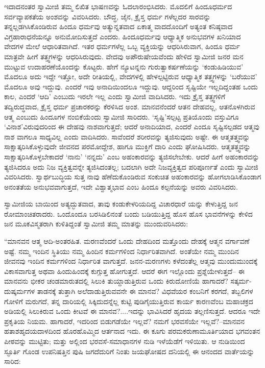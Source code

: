 ಇದಾದನಂತರ ಸ್ವಾಮೀಜಿ ತಮ್ಮ ಲಿಖಿತ ಭಾಷಣವನ್ನು ಓದಲಾರಂಭಿಸಿದರು. ಮೊದಲಿಗೆ ಹಿಂದೂಧರ್ಮದ ಸರ್ವವ್ಯಾಪಕತೆಯ ಅಂಶವನ್ನು ವಿವರಿಸಿದರು. ಬೌದ್ಧ, ಜೈನ, ಕ್ರೈಸ್ತ ಧರ್ಮ ಗಳೆಲ್ಲದರ ಸಾರವನ್ನು ತನ್ನಲ್ಲಡಗಿಸಿಕೊಂಡಿರುವ ಹಿಂದೂ ಧರ್ಮವು ಅತ್ಯುನ್ನತವಾದ ಏಕಾತ್ಮ ವಾದದೊಂದಿಗೆ ಅತ್ಯಂತ ಕನಿಷ್ಠವಾದ ವಿಗ್ರಹಾರಾಧನೆಯನ್ನೂ ಅನುಮೋದಿಸುತ್ತದೆ ಎಂದರು. ಹಿಂದೂಧರ್ಮವು ಆಧ್ಯಾತ್ಮಿಕ ಅನುಭವಗಳ ಖನಿಯಾದ ವೇದಗಳ ಮೇಲೆ ಆಧಾರಿತವಾಗಿದೆ. ಇತರ ಧರ್ಮಗಳೆಲ್ಲ ಒಬ್ಬ ವ್ಯಕ್ತಿಯನ್ನು ಆಧರಿಸಿರುವಾಗ, ಹಿಂದೂ ಧರ್ಮ ಮಾತ್ರವೇ ಹೀಗೆ ತತ್ತ್ವಗಳನ್ನು ಆಧರಿಸಿರುವುದು. ವೇದವು ಅಪೌರುಷೇಯವೆಂದು ಹೇಳಿದ ಸ್ವಾಮೀಜಿ ಜನರ ಮನ ಮುಟ್ಟುವ ಉದಾಹರಣೆಯೊಂದನ್ನು ಕೊಟ್ಟರು. ಹೇಗೆ ನ್ಯೂಟನ್ನನು ಗುರುತ್ವಾಕರ್ಷಣೆಯನ್ನು ‘ಕಂಡುಹಿಡಿಯುವ’ ಮೊದಲೂ ಅದು ಇದ್ದೇ ಇತ್ತೋ, ಅದೇ ರೀತಿಯಲ್ಲಿ, ವೇದಗಳಲ್ಲಿ ಹೇಳಲ್ಪಟ್ಟಿರುವ ಆಧ್ಯಾತ್ಮಿಕ ತತ್ತ್ವಗಳನ್ನು ‘ಬರೆಯುವ’ ಮೊದಲೂ ಅವು ಇದ್ದುವು. ಎಂದರೆ ಇವು ಅನಾದಿಯಿಂದಲೂ ಇದ್ದುವು. ಆದ್ದರಿಂದ ಸೃಷ್ಟಿಯೇ ಇಲ್ಲದಿದ್ದಂತಹ ಒಂದು ಕಾಲ, ಎಂದರೆ ‘ಆದಿ’ ಎಂಬುದು ಇರಲೇ ಇಲ್ಲ ಎಂದು ಸ್ವಾಮೀಜಿ ವಾದಿಸಿದರು. ಇದು ಕ್ರೈಸ್ತ ತತ್ತ್ವಗಳಿಗೆ ತದ್ವಿರುದ್ಧವಾದ, ಕ್ರೈಸ್ತ ಧರ್ಮ ಪ್ರಚಾರಕರನ್ನು ಕೆರಳಿಸಿದ ಅಂಶ. ಮಾನವನೆಂದರೆ ಆತನ ದೇಹವಲ್ಲ, ಆತನೊಳಗಿರುವ ಆತ್ಮ ಎಂಬುದು ಹಿಂದೂಗಳ ನಂಬಿಕೆಯೆಂದು ಸ್ವಾಮೀಜಿ ಸಾರಿದರು. ‘ಸೃಷ್ಟಿ’ಸಲ್ಪಟ್ಟ ಪ್ರತಿಯೊಂದು ವಸ್ತುವಿಗೂ ‘ವಿನಾಶ’ವಿರುವುದರಿಂದ ಈ ದೇಹವು ನಾಶವಾಗುತ್ತದೆ; ಆದರೆ ಅನಾದಿಯಾದ, ಎಂದರೆ ಎಂದೂ ಸೃಷ್ಟಿಸಲ್ಪಡದ ಆತ್ಮವು ನಾಶ ವಾಗಲೂ ಸಾಧ್ಯವಿಲ್ಲ ಎಂದು ವಾದಿಸಿದರು. ಸಾವೆಂದರೆ ಶರೀರವನ್ನು ತ್ಯಜಿಸುವುದು ಅಷ್ಟೇ. ಈ ಆತ್ಮತತ್ತ್ವವನ್ನು ಸಾಕ್ಷಾತ್ಕರಿಸಿಕೊಳ್ಳುವುದೇ ಜೀವನದ ಪರಮೋದ್ದೇಶ, ಹಾಗೂ ಮುಕ್ತಿಗೆ ದಾರಿ ಎಂದು ಘೋಷಿಸಿದರು. ಆತ್ಮತತ್ತ್ವವನ್ನು ಸಾಕ್ಷಾತ್ಕರಿಸಿಕೊಳ್ಳಬೇಕಾದರೆ ‘ನಾನು’ ‘ನನ್ನದು’ ಎಂಬ ಅಹಂಕಾರವನ್ನು ತ್ಯಜಿಸಲೇಬೇಕು. ಆದರೆ ಹೀಗೆ ಅಹಂಕಾರವನ್ನು ತ್ಯಜಿಸಿದರೂ ಅದು ನಿಜ ವ್ಯಕ್ತಿತ್ವವನ್ನೇ ತ್ಯಜಿಸಿದಂತಲ್ಲ; ಬದಲಾಗಿ ಅದೇ ನಿಜವ್ಯಕ್ತಿತ್ವದ ಪರಿಪೂರ್ಣತೆ ಎಂದು ಸ್ವಾಮೀಜಿ ವಿವರಿಸಿದರು. ಸ್ವಾರ್ಥಬುದ್ಧಿಯ ಸುತ್ತ ನಾವು ಹೆಣೆದುಕೊಂಡಿರುವ ಸಂಕುಚಿತ ಅಹಂಕಾರವನ್ನು ಹೋಗಲಾಡಿಸಿಕೊಂಡಾಗ ಅನಂತತೆಯ ಅನುಭವವಾಗುತ್ತದೆ, ಇದೇ ವಿಶ್ವಾತ್ಮಭಾವ ಎಂಬ ಹಿಂದೂ ಕಲ್ಪನೆಯನ್ನು ಅವರು ವಿವರಿಸಿದರು.

ಸ್ವಾಮೀಜಿಯ ಬಾಯಿಂದ ಅತ್ಯದ್ಭುತವಾದ, ತಾವು ಕಂಡುಕೇಳರಿಯದಿದ್ದ ವಿಚಾರಧಾರೆ ಯನ್ನು ಕೇಳುತ್ತಿದ್ದ ಜನ ರೋಮಾಂಚಿತರಾದರು. ಒಂದೊಂದೂ ಬರಸಿಡಿಲಿನಂತೆ ಬಂದು ಬಡಿಯುತ್ತಿದ್ದ ಹೊಸ ಹೊಸ ಭಾವನೆಗಳನ್ನು ಕೇಳಿದ ಜನ ಮೂಕವಿಸ್ಮತರಾಗಿ ಕುಳಿತಿದ್ದಂತೆ ಸ್ವಾಮೀಜಿ ತಮ್ಮ ಮಾತನ್ನು ಮುಂದುವರಿಸಿದರು:

“ಮಾನವನ ಆತ್ಮ ಆದಿ-ಅಂತರಹಿತ. ಮರಣವೆಂದರೆ ಒಂದು ದೇಹದಿಂದ ಮತ್ತೊಂದು ದೇಹಕ್ಕೆ ಆತ್ಮನ ವರ್ಗಾವಣೆ ಅಷ್ಟೆ. ನಮ್ಮ ಇಂದಿನ ಸ್ಥಿತಿಯು ನಮ್ಮ ಹಿಂದಿನ ಕರ್ಮಗಳಿಂದ ನಿರ್ಧಾರಿತವಾಗಿದೆ. ಅಂತೆಯೇ ನಮ್ಮ ಮುಂದಿನ ಜೀವನವು ಇಂದಿನ ಕರ್ಮಗಳಿಂದ ನಿರ್ಧಾರಿತ ವಾಗುತ್ತದೆ. ಜನನ-ಮರಣಗಳು ಕಳೆದಂತೆಲ್ಲ ಆತ್ಮವು ಮುಂದುಮುಂದಕ್ಕೆ ವಿಕಾಸವಾಗುತ್ತ ಅಥವಾ ಹಿಂದುಹಿಂದಕ್ಕೆ ಕುಗ್ಗುತ್ತ ಹೋಗುತ್ತದೆ. ಆದರೆ ಈಗ ಇಲ್ಲೊಂದು ಪ್ರಶ್ನೆಯೇಳುತ್ತದೆ– ಈ ಮಾನವನು ಭೀಕರ ಚಂಡಮಾರುತದಲ್ಲಿ ಸಿಲುಕಿ ತುಯ್ದಾಡುತ್ತಿರುವ ಒಂದು ಕಿರುದೋಣಿಯೆ ಹಾಗಾದರೆ? ಸತ್ಕರ್ಮ-ದುಷ್ಕರ್ಮಗಳ ತಾಡನಕ್ಕೆ ತುತ್ತಾಗಿ ಅಲೆದಾಡುತ್ತಿರುವವನೇ ಈ ಮಾನವ? ವಿಧವೆಯರ ಕಂಬನಿಗೆ ಕರಗದೆ, ತಬ್ಬಲಿಗಳ ಗೋಳಿಗೆ ಮರುಗದೆ, ತನ್ನ ದಾರಿಯಲ್ಲಿ ಸಿಕ್ಕಿದುದನ್ನೆಲ್ಲ ಕುಟ್ಟಿ ಪುಡಿಗೈಯುತ್ತಿರುವ ಕಾರ್ಯ ಕಾರಣವೆಂಬ ಮಹಾಚಕ್ರದ ಅಡಿಯಲ್ಲಿ ಸಿಲುಕಿರುವ ಒಂದು ಕೀಟವೆ ಈ ಮಾನವ?....ಇದನ್ನು ಭಾವಿಸಿದರೆ ಹೃದಯ ತಲ್ಲಣಿಸುತ್ತದೆ. ಆದರೂ ಇದೇ ಪ್ರಕೃತಿಯ ನಿಯಮ. ಹಾಗಾದರೆ, ಇದರಿಂದ ಬಿಡುಗಡೆಯೇ ಇಲ್ಲವೆ? ನಮಗೆ ಭರವಸೆಯೇ ಇಲ್ಲವೆ?–ಮಾನವನ ಹತಾಶಹೃದಯದಾಳದಿಂದ ಹೊರಹೊಮ್ಮಿದ ಆರ್ತನಾದ ಇದು. ಈ ಕೂಗು ಪರಮಕರುಣಾಮೂರ್ತಿಯಾದ ಭಗವಂತನ ಪೀಠವನ್ನು ಮುಟ್ಟಿತು; ಮತ್ತು ಅಲ್ಲಿಂದ ಭರವಸೆ-ಸಮಾಧಾನಗಳ ನುಡಿ ಇಳೆಯೆಡೆಗೆ ಇಳಿಯಿತು. ಆ ನುಡಿಯಿಂದ ಸ್ಫೂರ್ತಿ ಗೊಂಡ ಉಪನಿಷತ್ತಿನ ಪುಷಿ ಜಗದೆದುರಿಗೆ ನಿಂತು ಜಯಘೋಷದ ದನಿಯಲ್ಲಿ ಈ ಆನಂದದ ವಾರ್ತೆಯನ್ನು ಸಾರಿದ:

